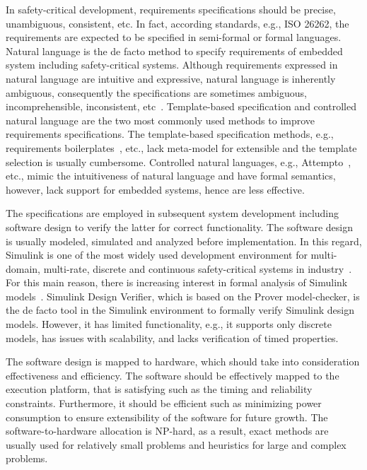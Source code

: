 In safety-critical development, requirements specifications should be precise, unambiguous, consistent, etc. In fact, according standards, e.g., ISO 26262, the requirements are expected to be specified in semi-formal or formal languages. Natural language is the de facto method to specify requirements of embedded system including safety-critical systems. Although requirements expressed in natural language are intuitive and expressive, natural language is inherently ambiguous, consequently the specifications are sometimes ambiguous, incomprehensible, inconsistent, etc~\cite{ieereqspecstandard}. Template-based specification and controlled natural language are the two most commonly used methods to improve requirements specifications. The template-based specification methods, e.g., requirements boilerplates~\cite{Hull2011RequirementsEngineering}, etc.,  lack meta-model for extensible and the template selection is usually cumbersome. Controlled natural languages, e.g., Attempto~\cite{attempto96}\cite{Fuchs2008AttemptoRepresentation}, etc., mimic the intuitiveness of natural language and have formal semantics, however, lack support for embedded systems, hence are less effective. 

The specifications are employed in subsequent system development including software design to verify the latter for correct functionality. The software design is usually modeled, simulated and analyzed before implementation. In this regard, Simulink is one of the most widely used development environment for multi-domain, multi-rate, discrete and continuous safety-critical systems in industry~\cite{JamesB.Dabney2003MasteringSimulink}. For this main reason, there is increasing interest in formal analysis of Simulink models~\cite{Manamcheri2011AModels}\cite{Sims2007ExperienceReport}. Simulink Design Verifier, which is based on the Prover model-checker, is the de facto tool in the Simulink environment to formally verify Simulink design models. However, it has limited functionality, e.g., it supports only discrete models, has issues with scalability, and lacks verification of timed properties. 

The software design is mapped to hardware, which should take into consideration effectiveness and efficiency. The software should be effectively mapped to the execution platform, that is satisfying such as the timing and reliability constraints. Furthermore, it should be efficient such as minimizing power consumption to ensure extensibility of the software for future growth. The software-to-hardware allocation is NP-hard, as a result, exact methods are usually used for relatively small problems and heuristics for large and complex problems.

